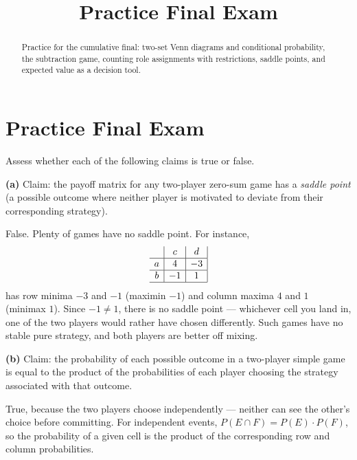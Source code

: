 \documentclass[12pt]{ximera}
\title{Practice Final Exam}
\begin{document}
\begin{abstract}
Practice for the cumulative final: two-set Venn diagrams and conditional probability,
the subtraction game, counting role assignments with restrictions, saddle points, and
expected value as a decision tool.
\end{abstract}
\maketitle

\section*{Practice Final Exam}

\begin{problem}
Assess whether each of the following claims is true or false.

\begin{prompt}
\textbf{(a)} Claim: the payoff matrix for any two-player zero-sum game has a
\emph{saddle point} (a possible outcome where neither player is motivated to deviate
from their corresponding strategy).

\begin{multipleChoice}
\end{multipleChoice}

\begin{feedback}
False. Plenty of games have no saddle point. For instance,
\[
\begin{array}{c|c|c|}
\phantom{|} & c & d \\\hline
a & 4 & -3 \\\hline
b & -1 & 1 \\\hline
\end{array}
\]
has row minima $-3$ and $-1$ (maximin $-1$) and column maxima $4$ and $1$
(minimax $1$). Since $-1\neq 1$, there is no saddle point --- whichever cell you
land in, one of the two players would rather have chosen differently. Such games have
no stable pure strategy, and both players are better off mixing.
\end{feedback}
\end{prompt}

\begin{prompt}
\textbf{(b)} Claim: the probability of each possible outcome in a two-player simple
game is equal to the product of the probabilities of each player choosing the
strategy associated with that outcome.

\begin{multipleChoice}
\end{multipleChoice}

\begin{feedback}
True, because the two players choose independently --- neither can see the other's
choice before committing. For independent events,
$P(E\cap F)=P(E)\cdot P(F)$, so the probability of a given cell is the product of the
corresponding row and column probabilities.
\end{feedback}
\end{prompt}
\end{problem}
\end{document}

